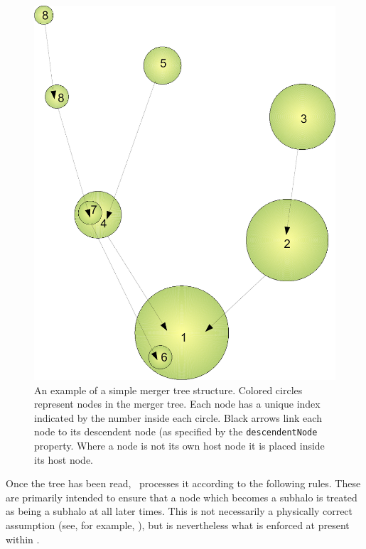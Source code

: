 \begin{figure}
 \begin{center}
 \includegraphics[width=160mm]{Diagrams/MergerTreeSimple.pdf}
 \end{center}
 \caption{An example of a simple merger tree structure. Colored circles represent nodes in the merger tree. Each node has a unique index indicated by the number inside each circle. Black arrows link each node to its descendent node (as specified by the {\tt descendentNode} property. Where a node is not its own host node it is placed inside its host node.}
 \label{fig:MergerTreeSimple}
\end{figure}

Once the tree has been read, \glc\ processes it according to the following rules. These are primarily intended to ensure that a node which becomes a subhalo is treated as being a subhalo at all later times. This is not necessarily a physically correct assumption (see, for example, \citealt{sales_cosmic_2007}), but is nevertheless what is enforced at present within \glc.

